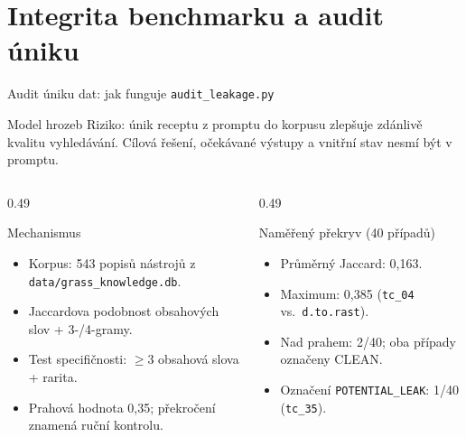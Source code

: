 \documentclass[aspectratio=169,11pt]{beamer}
\begin{document}
\section{Integrita benchmarku a audit úniku}

\begin{frame}[t]{Audit úniku dat: jak funguje \texttt{audit\_leakage.py}}
  \small
  \begin{alertblock}{Model hrozeb}
    Riziko: únik receptu z promptu do korpusu zlepšuje zdánlivě kvalitu
    vyhledávání. Cílová řešení, očekávané výstupy a vnitřní stav nesmí být
    v promptu.
  \end{alertblock}

  \begin{columns}[T,onlytextwidth]
    \begin{column}{0.49\textwidth}
      \begin{block}{Mechanismus}
        \begin{itemize}
          \item Korpus: 543 popisů nástrojů z
                \texttt{data/grass\_knowledge.db}.
          \item Jaccardova podobnost obsahových slov + 3-/4-gramy.
          \item Test specifičnosti: $\geq$3 obsahová slova + rarita.
          \item Prahová hodnota 0{,}35; překročení znamená ruční kontrolu.
        \end{itemize}
      \end{block}
    \end{column}
    \begin{column}{0.49\textwidth}
      \begin{block}{Naměřený překryv (40 případů)}
        \begin{itemize}
          \item Průměrný Jaccard: 0{,}163.
          \item Maximum: 0{,}385 (\texttt{tc\_04} vs.\ \texttt{d.to.rast}).
          \item Nad prahem: 2/40; oba případy označeny CLEAN.
          \item Označení \texttt{POTENTIAL\_LEAK}: 1/40 (\texttt{tc\_35}).
        \end{itemize}
      \end{block}
    \end{column}
  \end{columns}

\end{frame}
\end{document}
